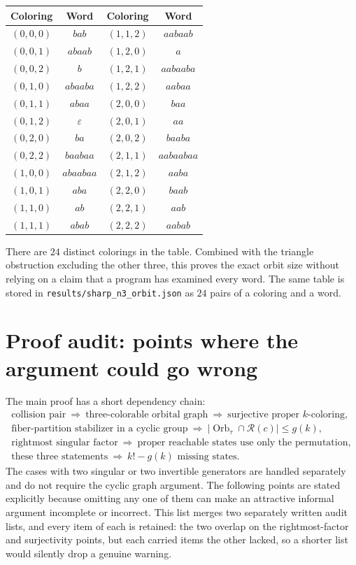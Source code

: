 \documentclass[11pt,a4paper]{article}
\numberwithin{equation}{section}
\theoremstyle{definition}
\theoremstyle{remark}
\newcommand{\Orb}{\operatorname{Orb}}
\begin{document}
\begin{center}
\begin{tabular}{cc@{\qquad\qquad}cc}
\toprule
Coloring & Word & Coloring & Word\\
\midrule
$(0,0,0)$ & $bab$ & $(1,1,2)$ & $aabaab$\\
$(0,0,1)$ & $abaab$ & $(1,2,0)$ & $a$\\
$(0,0,2)$ & $b$ & $(1,2,1)$ & $aabaaba$\\
$(0,1,0)$ & $abaaba$ & $(1,2,2)$ & $aabaa$\\
$(0,1,1)$ & $abaa$ & $(2,0,0)$ & $baa$\\
$(0,1,2)$ & $\varepsilon$ & $(2,0,1)$ & $aa$\\
$(0,2,0)$ & $ba$ & $(2,0,2)$ & $baaba$\\
$(0,2,2)$ & $baabaa$ & $(2,1,1)$ & $aabaabaa$\\
$(1,0,0)$ & $abaabaa$ & $(2,1,2)$ & $aaba$\\
$(1,0,1)$ & $aba$ & $(2,2,0)$ & $baab$\\
$(1,1,0)$ & $ab$ & $(2,2,1)$ & $aab$\\
$(1,1,1)$ & $abab$ & $(2,2,2)$ & $aabab$\\
\bottomrule
\end{tabular}
\end{center}

There are $24$ distinct colorings in the table. Combined with the triangle
obstruction excluding the other three, this proves the exact orbit size
without relying on a claim that a program has examined every word.
The same table is stored in \texttt{results/sharp\_n3\_orbit.json} as $24$
pairs of a coloring and a word.

\section{Proof audit: points where the argument could go wrong}\label{app:audit}

The main proof has a short dependency chain:
\[
 \begin{gathered}
 \text{collision pair}\ \Longrightarrow\ \text{three-colorable orbital graph}
 \ \Longrightarrow\ \text{surjective proper }k\text{-coloring},\\
 \text{fiber-partition stabilizer in a cyclic group}
 \ \Longrightarrow\ |\Orb_\tau\cap\mathcal R(c)|\le g(k),\\
 \text{rightmost singular factor}
 \ \Longrightarrow\ \text{proper reachable states use only the permutation},\\
 \text{these three statements}\ \Longrightarrow\ k!-g(k)\text{ missing states}.
 \end{gathered}
\]
The cases with two singular or two invertible generators are handled
separately and do not require the cyclic graph argument. The following points
are stated explicitly because omitting any one of them can make an attractive
informal argument incomplete or incorrect. This list merges two separately
written audit lists, and every item of each is retained: the two overlap on
the rightmost-factor and surjectivity points, but each carried items the
other lacked, so a shorter list would silently drop a genuine warning.
\end{document}
